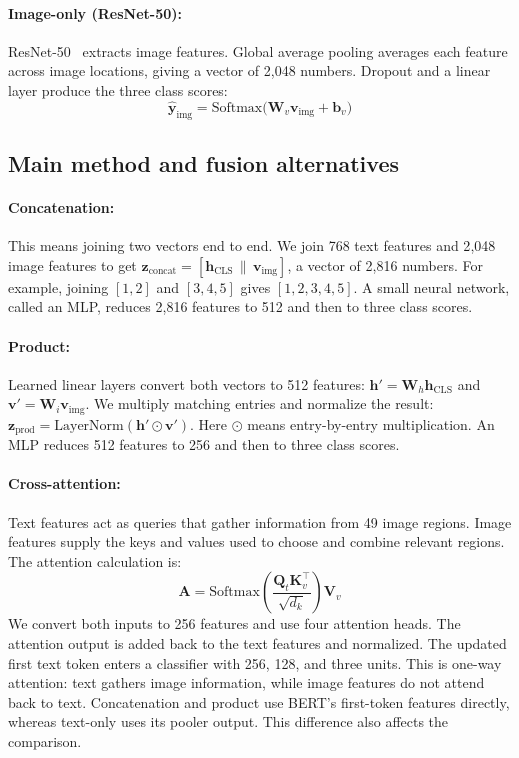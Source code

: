 \documentclass[11pt,a4paper]{article}
\begin{document}
\paragraph{Image-only (ResNet-50):} ResNet-50~\cite{he2016deep} extracts image features. Global average pooling averages each feature across image locations, giving a vector of 2{,}048 numbers. Dropout and a linear layer produce the three class scores:
\begin{equation}
    \hat{\mathbf{y}}_{\text{img}} = \mathrm{Softmax}\big( \mathbf{W}_v \mathbf{v}_{\text{img}} + \mathbf{b}_v \big)
\end{equation}

\subsection{Main method and fusion alternatives}
\paragraph{Concatenation:} This means joining two vectors end to end. We join 768 text features and 2{,}048 image features to get $\mathbf{z}_{\text{concat}}=[\mathbf{h}_{\text{CLS}}\,\|\,\mathbf{v}_{\text{img}}]$, a vector of 2{,}816 numbers. For example, joining $[1,2]$ and $[3,4,5]$ gives $[1,2,3,4,5]$. A small neural network, called an MLP, reduces 2{,}816 features to 512 and then to three class scores.

\paragraph{Product:} Learned linear layers convert both vectors to 512 features: $\mathbf{h}'=\mathbf{W}_h\mathbf{h}_{\text{CLS}}$ and $\mathbf{v}'=\mathbf{W}_i\mathbf{v}_{\text{img}}$. We multiply matching entries and normalize the result: $\mathbf{z}_{\text{prod}}=\mathrm{LayerNorm}(\mathbf{h}'\odot\mathbf{v}')$. Here $\odot$ means entry-by-entry multiplication. An MLP reduces 512 features to 256 and then to three class scores.

\paragraph{Cross-attention:} Text features act as queries that gather information from 49 image regions. Image features supply the keys and values used to choose and combine relevant regions. The attention calculation is:
\begin{equation}
    \mathbf{A} = \mathrm{Softmax}\left(\frac{\mathbf{Q}_t \mathbf{K}_v^\top}{\sqrt{d_k}}\right) \mathbf{V}_v
\end{equation}
We convert both inputs to 256 features and use four attention heads. The attention output is added back to the text features and normalized. The updated first text token enters a classifier with 256, 128, and three units. This is one-way attention: text gathers image information, while image features do not attend back to text. Concatenation and product use BERT's first-token features directly, whereas text-only uses its pooler output. This difference also affects the comparison.
\end{document}
